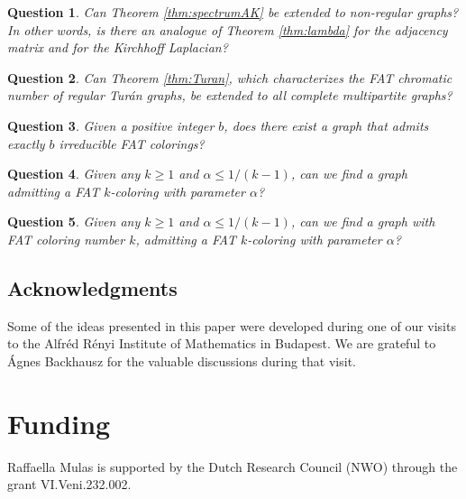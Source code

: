 \documentclass{article}
\theoremstyle{plain}
\newtheorem{question}{Question}
\theoremstyle{definition}
\theoremstyle{remark}
\begin{document}
\begin{question}
Can Theorem \ref{thm:spectrumAK} be extended to non-regular graphs? In other words, is there an analogue of Theorem \ref{thm:lambda} for the adjacency matrix and for the Kirchhoff Laplacian?
\end{question}


\begin{question}
Can Theorem \ref{thm:Turan}, which characterizes the FAT chromatic number of regular Turán graphs, be extended to all complete multipartite graphs?
\end{question}


\begin{question}
Given a positive integer $b$, does there exist a graph that admits exactly $b$ irreducible FAT colorings?
\end{question}


\begin{question}
    Given any $k\geq1$ and $\alpha\leq1/(k-1)$, can we find a graph admitting a FAT $k$-coloring with parameter $\alpha$?
\end{question}

\begin{question}
    Given any $k\geq1$ and $\alpha\leq1/(k-1)$, can we find a graph with FAT coloring number $k$, admitting a FAT $k$-coloring with parameter $\alpha$?
\end{question}



\subsection*{Acknowledgments}
Some of the ideas presented in this paper were developed during one of our visits to the Alfréd Rényi Institute of Mathematics in Budapest. We are grateful to Ágnes Backhausz for the valuable discussions during that visit.

\section*{Funding}
Raffaella Mulas is supported by the Dutch Research Council (NWO) through the grant VI.Veni.232.002.

 


\end{document}

